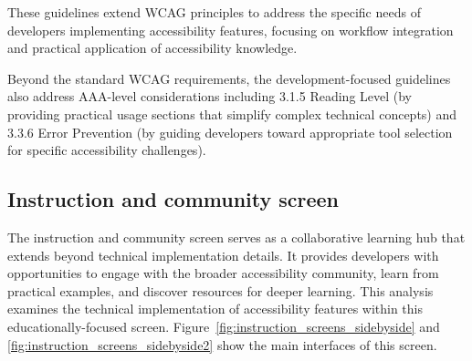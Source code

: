 These guidelines extend WCAG principles to address the specific needs of developers implementing accessibility features, focusing on workflow integration and practical application of accessibility knowledge.

Beyond the standard WCAG requirements, the development-focused guidelines also address AAA-level considerations including 3.1.5 Reading Level (by providing practical usage sections that simplify complex technical concepts) and 3.3.6 Error Prevention (by guiding developers toward appropriate tool selection for specific accessibility challenges).

\subsection{Instruction and community screen}
\label{subsec:instruction-community}

The instruction and community screen serves as a collaborative learning hub that extends beyond technical implementation details. It provides developers with opportunities to engage with the broader accessibility community, learn from practical examples, and discover resources for deeper learning. This analysis examines the technical implementation of accessibility features within this educationally-focused screen.
 Figure~\ref{fig:instruction_screens_sidebyside} and \ref{fig:instruction_screens_sidebyside2} show the main interfaces of this screen.

